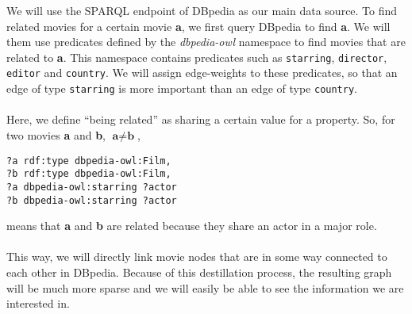 We will use the SPARQL endpoint of DBpedia as our main data source.
To find related movies for a certain movie \textbf{a}, we first query DBpedia to find \textbf{a}.
We will them use predicates defined by the \textit{dbpedia-owl} namespace to find movies that are related to \textbf{a}.
This namespace contains predicates such as \texttt{starring}, \texttt{director}, \texttt{editor} and \texttt{country}.
We will assign edge-weights to these predicates, so that an edge of type \texttt{starring}
is more important than an edge of type \texttt{country}.

\paragraph{}
Here, we define ``being related'' as sharing a certain value for a property.
So, for two movies \textbf{a} and \textbf{b}, $\textbf{a} \neq \textbf{b}$,

\begin{lstlisting}
?a rdf:type dbpedia-owl:Film,
?b rdf:type dbpedia-owl:Film,
?a dbpedia-owl:starring ?actor
?b dbpedia-owl:starring ?actor
\end{lstlisting}

means that \textbf{a} and \textbf{b} are related because they share an actor in a major role.

\paragraph{}
This way, we will directly link movie nodes that are in some way connected to each other in DBpedia.
Because of this destillation process, the resulting graph will be much more sparse
and we will easily be able to see the information we are interested in.

